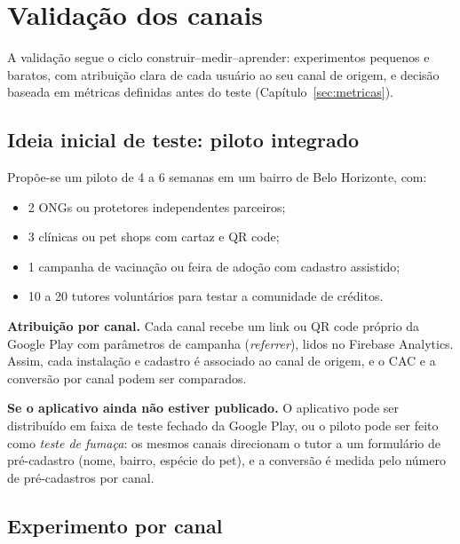 \section{Validação dos canais}
\label{sec:validacao}

A validação segue o ciclo construir--medir--aprender: experimentos pequenos e baratos,
com atribuição clara de cada usuário ao seu canal de origem, e decisão baseada em métricas
definidas antes do teste (Capítulo~\ref{sec:metricas}).

\subsection{Ideia inicial de teste: piloto integrado}

Propõe-se um piloto de 4 a 6 semanas em um bairro de Belo Horizonte, com:

\begin{itemize}
  \item 2 ONGs ou protetores independentes parceiros;
  \item 3 clínicas ou pet shops com cartaz e QR code;
  \item 1 campanha de vacinação ou feira de adoção com cadastro assistido;
  \item 10 a 20 tutores voluntários para testar a comunidade de créditos.
\end{itemize}

\textbf{Atribuição por canal.} Cada canal recebe um link ou QR code próprio da Google Play
com parâmetros de campanha (\emph{referrer}), lidos no Firebase Analytics. Assim, cada
instalação e cadastro é associado ao canal de origem, e o CAC e a conversão por canal podem
ser comparados.

\textbf{Se o aplicativo ainda não estiver publicado.} O aplicativo pode ser distribuído em
faixa de teste fechado da Google Play, ou o piloto pode ser feito como \emph{teste de
fumaça}: os mesmos canais direcionam o tutor a um formulário de pré-cadastro (nome, bairro,
espécie do pet), e a conversão é medida pelo número de pré-cadastros por canal.

\subsection{Experimento por canal}

